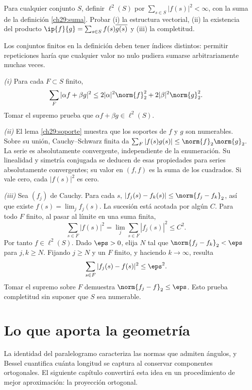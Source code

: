 \begin{ejercicio}
Para cualquier conjunto $S$, definir $\ell^{2}(S)$ por $\sum_{s\in S}|f(s)|^{2}<\infty$, con la suma de la definición \ref{ch29:suma}. Probar (i) la estructura vectorial, (ii) la existencia del producto $\ip{f}{g}=\sum_{s\in S}f(s)\overline{g(s)}$ y (iii) la completitud.
\end{ejercicio}
\begin{solucion}
Los conjuntos finitos en la definición deben tener índices distintos: permitir repeticiones haría que cualquier valor no nulo pudiera sumarse arbitrariamente muchas veces.

\emph{(i)} Para cada $F\subset S$ finito,
\[
 \sum_F|\alpha f+\beta g|^{2}
 \leq2|\alpha|^{2}\norm{f}_2^{2}+2|\beta|^{2}\norm{g}_2^{2}.
\]
Tomar el supremo prueba que $\alpha f+\beta g\in\ell^{2}(S)$.

\emph{(ii)} El lema \ref{ch29:soporte} muestra que los soportes de $f$ y $g$ son numerables. Sobre su unión, Cauchy--Schwarz finita da $\sum_F|f(s)g(s)|\leq\norm{f}_2\norm{g}_2$. La serie es absolutamente convergente, independiente de la enumeración. Su linealidad y simetría conjugada se deducen de esas propiedades para series absolutamente convergentes; su valor en $(f,f)$ es la suma de los cuadrados. Si vale cero, cada $|f(s)|^{2}$ es cero.

\emph{(iii)} Sea $(f_j)$ de Cauchy. Para cada $s$, $|f_j(s)-f_k(s)|\leq\norm{f_j-f_k}_2$, así que existe $f(s)=\lim_j f_j(s)$. La sucesión está acotada por algún $C$. Para todo $F$ finito, al pasar al límite en una suma finita,
\[
 \sum_{s\in F}|f(s)|^{2}=\lim_j\sum_{s\in F}|f_j(s)|^{2}\leq C^{2}.
\]
Por tanto $f\in\ell^{2}(S)$. Dado $\eps>0$, elija $N$ tal que $\norm{f_j-f_k}_2<\eps$ para $j,k\geq N$. Fijando $j\geq N$ y un $F$ finito, y haciendo $k\to\infty$, resulta
\[
 \sum_{s\in F}|f_j(s)-f(s)|^{2}\leq\eps^{2}.
\]
Tomar el supremo sobre $F$ demuestra $\norm{f_j-f}_2\leq\eps$. Esto prueba completitud sin suponer que $S$ sea numerable.
\end{solucion}

\section{Lo que aporta la geometría}
La identidad del paralelogramo caracteriza las normas que admiten ángulos, y Bessel cuantifica cuánta longitud se captura al conservar componentes ortogonales. El siguiente capítulo convertirá esta idea en un procedimiento de mejor aproximación: la proyección ortogonal.
